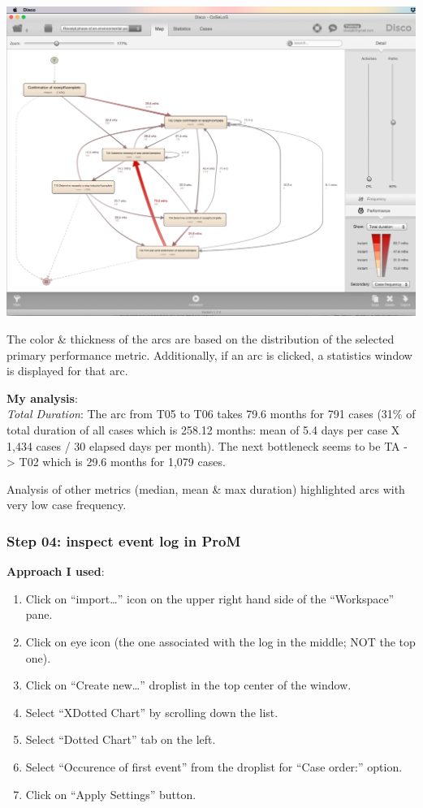 \documentclass[]{article}
\begin{document}
\includegraphics{CoSeLoG_Step_03.png}

The color \& thickness of the arcs are based on the distribution of the
selected primary performance metric. Additionally, if an arc is clicked,
a statistics window is displayed for that arc.

\textbf{My analysis}:\\\emph{Total Duration}: The arc from T05 to T06
takes 79.6 months for 791 cases (31\% of total duration of all cases
which is 258.12 months: mean of 5.4 days per case X 1,434 cases / 30
elapsed days per month). The next bottleneck seems to be TA
-\textgreater{} T02 which is 29.6 months for 1,079 cases.

Analysis of other metrics (median, mean \& max duration) highlighted
arcs with very low case frequency.

\subsubsection{Step 04: inspect event log in
ProM}\label{step-04-inspect-event-log-in-prom}

\textbf{Approach I used}:

\begin{enumerate}
\def\labelenumi{\arabic{enumi}.}
\itemsep1pt\parskip0pt
\item
  Click on ``import\ldots{}'' icon on the upper right hand side of the
  ``Workspace'' pane.\\
\item
  Click on eye icon (the one associated with the log in the middle; NOT
  the top one).\\
\item
  Click on ``Create new\ldots{}'' droplist in the top center of the
  window.\\
\item
  Select ``XDotted Chart'' by scrolling down the list.
\item
  Select ``Dotted Chart'' tab on the left.
\item
  Select ``Occurence of first event'' from the droplist for ``Case
  order:'' option.\\
\item
  Click on ``Apply Settings'' button.
\end{enumerate}
\end{document}
